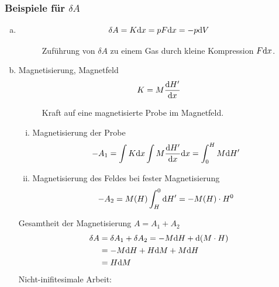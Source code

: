 \subsubsection{Beispiele für $\delta A$}
\begin{enumerate}[a)]
    \item
    \begin{equation}
        \delta A = K \mathrm{d} x = p F \mathrm{d} x = - p \mathrm{d} V
    \end{equation}
      
    \begin{figure}[H]
        \centering
        \def\svgwidth{0.4\textwidth}
        
        \caption{Zuführung von $\delta A$ zu einem Gas durch kleine Kompression $F \mathrm{d} x$.}
        \label{img:exampleDApiston}
    \end{figure}
    
    \item Magnetisierung, Magnetfeld
    \begin{equation}
        K = M \frac{\mathrm{d} H'}{\mathrm{d} x}
    \end{equation}
     
    \begin{figure}[H]
        \centering
        \def\svgwidth{0.4\textwidth}
        
        \caption{Kraft auf eine magnetisierte Probe im Magnetfeld.}
        \label{img:exampleDAmagnetism}
    \end{figure}
    
    \begin{enumerate}[i)]
        \item Magnetisierung der Probe
        \begin{equation}
            -A_1 = \int K \mathrm{d} x \int M \frac{\mathrm{d} H'}{\mathrm{d} x} \mathrm{d} x = \int_{0}^{H} M \mathrm{d} H'
        \end{equation}
        \item Magnetisierung des Feldes bei fester Magnetisierung
        \begin{equation}
            - A_2 = M(H) \int_{H}^{0} \mathrm{d} H' = - M(H) \cdot H^0
        \end{equation}
    \end{enumerate}
    Gesamtheit der Magnetisierung $A = A_1 + A_2$
    \begin{equation}
        \begin{split}
            \delta A &= \delta A_1 + \delta A_2 = - M \mathrm{d} H + \mathrm{d}(M \cdot H) \\
            &= - M \mathrm{d} H + H \mathrm{d} M + M \mathrm{d} H \\
            &= H \mathrm{d} M
        \end{split}
    \end{equation}
    Nicht-inifitesimale Arbeit:
      

\end{enumerate}
